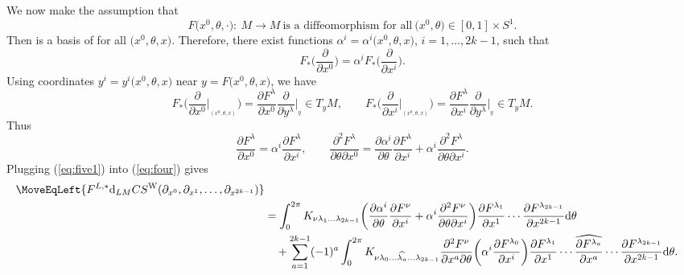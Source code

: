 \documentclass[pdftex]{sigma}
\numberwithin{equation}{section}
\theoremstyle{definition}
\newcommand{\bm}{ M}
\begin{document}
We now make the assumption that
\begin{equation}\label{eq:diff}
F\bigl(x^0, \theta,\cdot\bigr)\colon\ \bm\to\bm \ \text{is a diffeomorphism for all} \ \bigl(x^0,\theta\bigr)\in [0,1]\times S^1.
\end{equation}
Then  is a basis of {\smash{$T_{F(x^0,\theta,x)}\bm$}} for all $\bigl(x^0,\theta,x\bigr)$.
Therefore, there exist functions $\alpha^i =\alpha^i\bigl(x^0,\theta,x\bigr)$, $i = 1,\dots,2k-1$, such that
\begin{equation}\label{eq:five} F_*\biggl(\frac{\partial}{\partial x^0}\biggr) =
\alpha^iF_*\biggl(\frac{\partial}{\partial x^i}\biggr).
\end{equation}
Using coordinates $y^i = y^i\bigl(x^0,\theta, x\bigr)$ near $y = F\bigl(x^0,\theta,x\bigr)$, we have
\[F_*\biggl(\frac{\partial}{\partial x^0}\biggl|_{_{(x^0, \theta,x)}}\biggr) = \frac{\partial F^\lambda}{\partial x^0} \frac{\partial}{\partial y^\lambda}\biggl|_{_{y}} \in T_y\bm,\qquad
F_*\biggl(\frac{\partial}{\partial x^i}\biggl|_{_{(x^0, \theta,x)}}\biggr) = \frac{\partial F^\lambda}{\partial x^i} \frac{\partial}{\partial y^\lambda}\biggl|_{_{y}} \in T_y\bm.\]
Thus
\begin{equation}\label{eq:five1}
\frac{\partial F^\lambda}{\partial x^0} = \alpha^i\frac{\partial F^\lambda}{\partial x^i},\qquad
\frac{\partial^2 F^\lambda}{\partial\theta \partial x^0} =
\frac{\partial \alpha^i}{\partial\theta} \frac{\partial F^\lambda}{\partial x^i}
+ \alpha^i\frac{\partial^2 F^\lambda}{\partial\theta \partial x^i}.
\end{equation}
Plugging (\ref{eq:five1}) into (\ref{eq:four}) gives
\begin{align*}%
\MoveEqLeft{F^{L,*} {\rm d}_{L{\bm}} CS^{\rm W}
(\partial_{x^0}, \partial_{x^1},
\dots, \partial_{x^{2k-1}})}\nonumber\\
&=
 \int_0^{2\pi} K_{\nu \lambda_1 \dots \lambda_{2k-1}}
\biggl( \frac{\partial \alpha^i}{\partial\theta} \frac{\partial F^\nu}{\partial x^i}
+ \alpha^i\frac{\partial^2 F^\nu}{\partial\theta \partial x^i}\biggr)
\frac{\partial F^{\lambda_1}}{\partial x^1}
\cdots
\frac{\partial F^{\lambda_{2k-1}}}{\partial x^{2k-1}}
 {\rm d}\theta\\
&\quad +\sum_{a=1}^{2k-1}
(-1)^a
\int_0^{2\pi}
K_{\nu \lambda_0 \dots \widehat{\lambda_a} \dots \lambda_{2k-1}}
\frac{\partial^2 F^\nu}{\partial x^a \partial \theta} \biggl( \alpha^i\frac{\partial F^{\lambda_0}}{\partial x^i}
\biggr) \frac{\partial F^{\lambda_1}}{\partial x^1}
\cdots
\widehat{\frac{\partial F^{\lambda_a}}{\partial x^a}}
\cdots
\frac{\partial F^{\lambda_{2k-1}}}{\partial x^{2k-1}}
 {\rm d}\theta. \nonumber
\end{align*}
\end{document}
